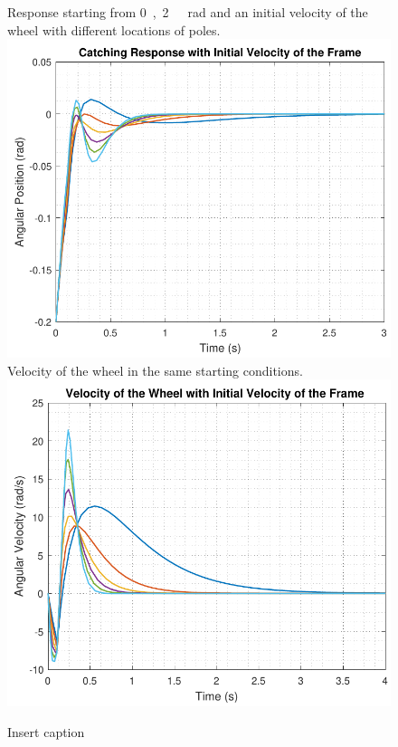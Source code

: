 \begin{figure}[H]
	\begin{minipage}{\linewidth}
		\captionsetup[subfigure]{font = footnotesize}
		\centering
		\subcaptionbox
		{
			Response starting from \si{0,2\ rad} and an initial velocity of the wheel with different locations of poles.
			\label{catchingStateSpace}
		}
		{
			\includegraphics[scale=.55]{figures/catchingStateSpace}
		}\quad
		\subcaptionbox
		{
			Velocity of the wheel in the same starting conditions.
			\label{catchingStateSpaceWheel}
		}
		{
			\includegraphics[scale=.55]{figures/catchingStateSpaceWheel}
		}
		\caption{Insert caption}
		\label{catchingStateSpaceFrameAndWheel}
	\end{minipage}
\end{figure}
